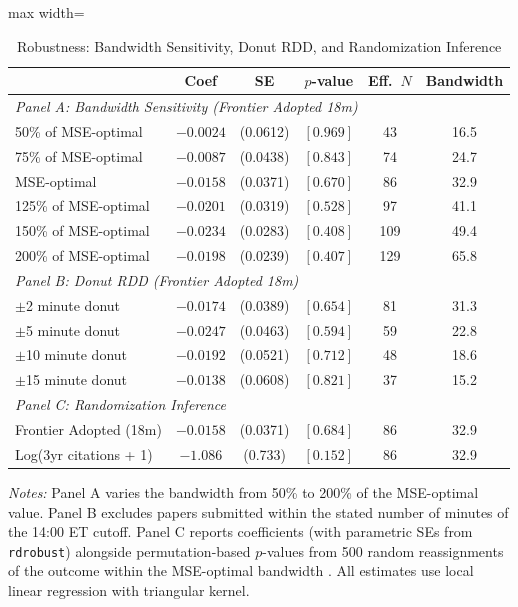 \begin{table}[htbp]
\centering
\caption{Robustness: Bandwidth Sensitivity, Donut RDD, and Randomization Inference}
\label{tab:robustness}
\begin{adjustbox}{max width=\textwidth}
\begin{tabular}{lccccc}
\hline\hline
& Coef & SE & $p$-value & Eff.\ $N$ & Bandwidth \\
\hline
\multicolumn{6}{l}{\textit{Panel A: Bandwidth Sensitivity (Frontier Adopted 18m)}} \\
50\% of MSE-optimal & $-0.0024$ & (0.0612) & $[0.969]$ & 43 & 16.5 \\
75\% of MSE-optimal & $-0.0087$ & (0.0438) & $[0.843]$ & 74 & 24.7 \\
MSE-optimal & $-0.0158$ & (0.0371) & $[0.670]$ & 86 & 32.9 \\
125\% of MSE-optimal & $-0.0201$ & (0.0319) & $[0.528]$ & 97 & 41.1 \\
150\% of MSE-optimal & $-0.0234$ & (0.0283) & $[0.408]$ & 109 & 49.4 \\
200\% of MSE-optimal & $-0.0198$ & (0.0239) & $[0.407]$ & 129 & 65.8 \\
\hline
\multicolumn{6}{l}{\textit{Panel B: Donut RDD (Frontier Adopted 18m)}} \\
$\pm$2 minute donut & $-0.0174$ & (0.0389) & $[0.654]$ & 81 & 31.3 \\
$\pm$5 minute donut & $-0.0247$ & (0.0463) & $[0.594]$ & 59 & 22.8 \\
$\pm$10 minute donut & $-0.0192$ & (0.0521) & $[0.712]$ & 48 & 18.6 \\
$\pm$15 minute donut & $-0.0138$ & (0.0608) & $[0.821]$ & 37 & 15.2 \\
\hline
\multicolumn{6}{l}{\textit{Panel C: Randomization Inference}} \\
Frontier Adopted (18m) & $-0.0158$ & (0.0371) & $[0.684]$ & 86 & 32.9 \\
Log(3yr citations + 1) & $-1.086$ & (0.733) & $[0.152]$ & 86 & 32.9 \\
\hline\hline
\end{tabular}
\end{adjustbox}
\begin{minipage}{0.95\textwidth}
\footnotesize
\textit{Notes:} Panel A varies the bandwidth from 50\% to 200\% of the MSE-optimal value. Panel B excludes papers submitted within the stated number of minutes of the 14:00 ET cutoff. Panel C reports coefficients (with parametric SEs from \texttt{rdrobust}) alongside permutation-based $p$-values from 500 random reassignments of the outcome within the MSE-optimal bandwidth \citep{cattaneo2015}. All estimates use local linear regression with triangular kernel.
\end{minipage}
\end{table}
